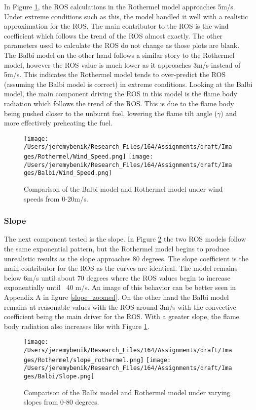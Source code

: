 \documentclass{article}
\begin{document}
\indent In Figure \ref{Wind Speed}, the ROS calculations in the Rothermel model approaches 5m/s. Under extreme conditions such as this, the model handled it well with a realistic approximation for the ROS. The main contributor to the ROS is the wind coefficient which follows the trend of the ROS almost exactly. The other parameters used to calculate the ROS do not change as those plots are blank. The Balbi model on the other hand follows a similar story to the Rothermel model, however the ROS value is much lower as it approaches 3m/s instead of 5m/s. This indicates the Rothermel model tends to over-predict the ROS (assuming the Balbi model is correct) in extreme conditions. Looking at the Balbi model, the main component driving the ROS in this model is the flame body radiation which follows the trend of the ROS. This is due to the flame body being pushed closer to the unburnt fuel, lowering the flame tilt angle ($\gamma$) and more effectively preheating the fuel.
\newpage
\begin{figure}[!h]
\centering
  \texttt{[image: /Users/jeremybenik/Research\_Files/164/Assignments/draft/Images/Rothermel/Wind\_Speed.png]}
  \texttt{[image: /Users/jeremybenik/Research\_Files/164/Assignments/draft/Images/Balbi/Wind\_Speed.png]}
  \caption{Comparison of the Balbi model and Rothermel model under wind speeds from 0-20m/s.}
  \label{Wind Speed}
\end{figure}
\subsubsection{Slope}

\indent The next component tested is the slope. In Figure \ref{Slope} the two ROS models follow the same exponential pattern, but the Rothermel model begins to produce unrealistic results as the slope approaches 80 degrees. The slope coefficient is the main contributor for the ROS as the curves are identical. The model remains below 6m/s until about 70 degrees where the ROS values begin to increase exponentially until ~40 m/s. An image of this behavior can be better seen in Appendix A in figure \ref{slope_zoomed}. On the other hand the Balbi model remains at reasonable values with the ROS around 3m/s with the convective coefficient being the main driver for the ROS. With a greater slope, the flame body radiation also increases like with Figure \ref{Wind Speed}. 
\newpage
\begin{figure}[!h]
\centering
  \texttt{[image: /Users/jeremybenik/Research\_Files/164/Assignments/draft/Images/Rothermel/slope\_rothermel.png]}
  \texttt{[image: /Users/jeremybenik/Research\_Files/164/Assignments/draft/Images/Balbi/Slope.png]}
  \caption{Comparison of the Balbi model and Rothermel model under varying slopes from 0-80 degrees.}
  \label{Slope}
\end{figure}
\end{document}

